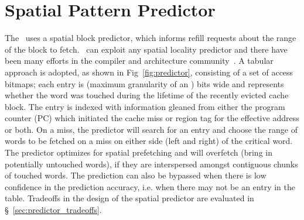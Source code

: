 \section{Spatial Pattern Predictor}
\label{sec:spatial_pattern_predictor}

The \AC\ uses a spatial block predictor, which  informs refill requests about the range of the block to fetch. \AC\ can exploit any spatial locality predictor and there have been many efforts in the compiler and architecture community~\cite{Chilimbi-Hill-pldi-1999, kumar-isca-1998, pujara-hpca-2006,chen-hpca-2004}. A tabular approach is adopted, as shown in Fig~\ref{fig:predictor}, consisting of a set of access bitmaps; each entry is  (maximum granularity of an \AB{}) bits wide and represents whether the word was touched during the lifetime of the recently evicted cache block. The entry is indexed with information gleaned from either the program counter (PC) which initiated the cache miss or region tag for the effective address or both. On a miss, the predictor will search for an entry  and choose the range of words to be fetched on a miss on either side (left and right) of the critical word. The predictor optimizes for spatial prefetching and will  overfetch (bring in potentially untouched words), if they are interspersed amongst contiguous chunks of touched words. The prediction can also be bypassed when there is low confidence in the prediction accuracy, i.e. when there may not be an entry in the table. Tradeoffs in the design of the spatial predictor are evaluated in \S~\ref{sec:predictor_tradeoffs}.


